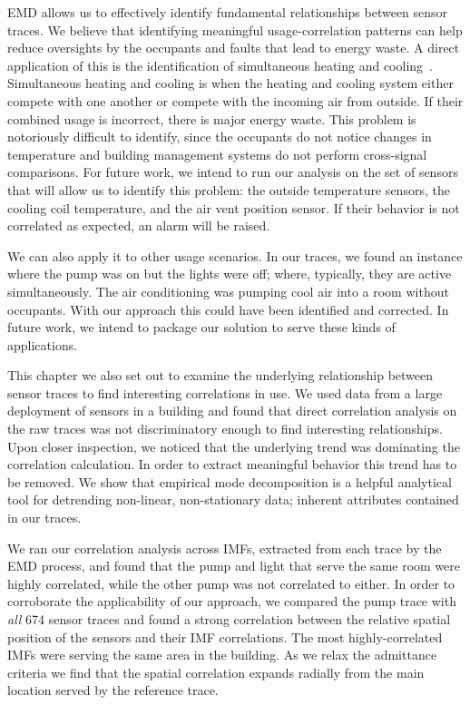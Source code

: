 EMD allows us to effectively identify fundamental relationships between sensor traces.
We believe that identifying meaningful usage-correlation patterns can help reduce oversights
by the occupants and faults that lead to energy waste.  A direct application of this is the identification
of simultaneous heating and cooling~\cite{simheatcool}.  Simultaneous heating and cooling is when the heating
and cooling system either compete with one another or compete with the incoming air from outside.  If
their combined usage is incorrect, there is major energy waste.
This problem is notoriously difficult to identify, since the occupants do not notice
changes in temperature and building management systems do not perform cross-signal comparisons.  For 
future work, we intend to run our analysis on the set of sensors that will
allow us to identify this problem: the outside temperature sensors, the cooling
coil temperature, and the air vent position sensor.  If their behavior
is not correlated as expected, an alarm will be raised.

We can also apply it to other usage scenarios.  In our traces, we found an instance where the pump
was on but the lights were off; where, typically, they are active simultaneously.
The air conditioning was pumping cool air into a room without occupants.
With our approach this could have been identified and corrected.  In future work, we intend to
package our solution to serve these kinds of applications.


This chapter we also set out to examine the underlying relationship between sensor traces to find interesting correlations
in use.  We used data from a large deployment of sensors in a building and found that direct correlation analysis on the raw
traces was not discriminatory enough to find interesting relationships.  Upon closer inspection, we noticed that
the underlying trend was dominating the correlation calculation.  In order to extract meaningful behavior this trend has
to be removed.  We show that empirical mode decomposition is a helpful analytical tool for detrending 
non-linear, non-stationary data; inherent attributes contained in our traces.

We ran our correlation analysis across IMFs, extracted from each trace by the EMD process, and found that the pump and light
that serve the same room were highly correlated, while the other pump was not correlated to either.
In order to corroborate the applicability
of our approach, we compared the pump trace with \emph{all} 674 sensor traces and found a strong correlation
between the relative spatial position of the sensors and their IMF correlations.  The most highly-correlated IMFs were 
serving the same
area in the building.  As we relax the admittance criteria we find that the spatial correlation expands radially from
the main location served by the reference trace.


